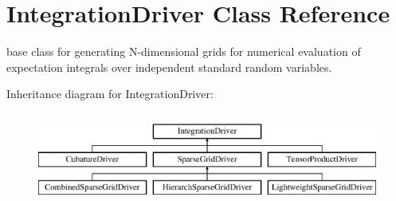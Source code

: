 \section{Integration\+Driver Class Reference}
\label{classPecos_1_1IntegrationDriver}


base class for generating N-\/dimensional grids for numerical evaluation of expectation integrals over independent standard random variables.  


Inheritance diagram for Integration\+Driver\+:\begin{figure}[H]
\begin{center}
\leavevmode
\includegraphics[height=3.000000cm]{classPecos_1_1IntegrationDriver}
\end{center}
\end{figure}
